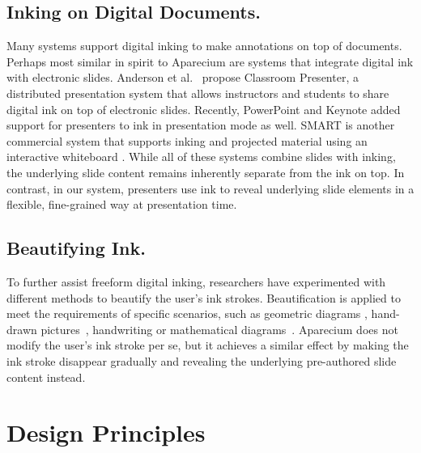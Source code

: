 \subsection{Inking on Digital Documents.} 
Many systems \cite{yoon2014richreview, marshall1999collaborating, hardock1993marking} support digital inking to make annotations on top of documents. Perhaps most similar in spirit to Aparecium are systems that integrate digital ink with electronic slides. Anderson et al.~\cite{anderson2007classroom} propose Classroom Presenter, a distributed presentation system that allows instructors and students to share digital ink on top of electronic slides. Recently, PowerPoint and Keynote added support for presenters to ink in presentation mode as well. SMART is another commercial system that supports inking and projected material using an interactive whiteboard \cite{smarttech2017}. While all of these systems combine slides with inking, the underlying slide content remains inherently separate from the ink on top. In contrast, in our system, presenters use ink to reveal underlying slide elements in a flexible, fine-grained way at presentation time.

\subsection{Beautifying Ink.} To further assist freeform digital inking, researchers have experimented with different methods to beautify the user's ink strokes. Beautification is applied to meet the requirements of specific scenarios, such as geometric diagrams \cite{igarashi1998pegasus, hse2005recognition, fivser2015shipshape}, hand-drawn pictures~\cite{xie2014portraitsketch, limpaecher2013}, handwriting \cite{zitnick2013handwriting} or mathematical diagrams~\cite{laviola2007mathpad}. Aparecium does not modify the user's ink stroke per se, but it achieves a similar effect by making the ink stroke disappear gradually and revealing the underlying pre-authored slide content instead.


\section{Design Principles}
